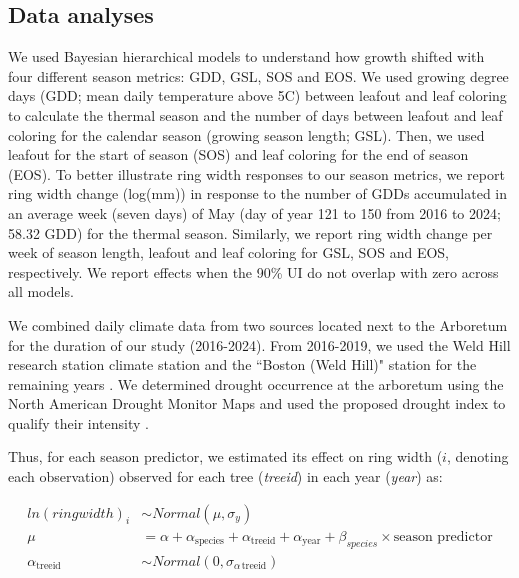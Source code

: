 \subsection{Data analyses}
We used Bayesian hierarchical models to understand how growth shifted with four different season metrics: GDD, GSL, SOS and EOS. We used growing degree days (GDD; mean daily temperature above 5\degree C) between leafout and leaf coloring to calculate the thermal season and the number of days between leafout and leaf coloring for the calendar season (growing season length; GSL). Then, we used leafout for the start of season (SOS) and leaf coloring for the end of season (EOS). To better illustrate ring width responses to our season metrics, we report ring width change (log(mm)) in response to the number of GDDs accumulated in an average week (seven days) of May (day of year 121 to 150 from 2016 to 2024; 58.32 GDD) for the thermal season. Similarly, we report ring width change per week of season length, leafout and leaf coloring for GSL, SOS and EOS, respectively. We report effects when the 90\% UI do not overlap with zero across all models.

We combined daily climate data from two sources located next to the Arboretum for the duration of our study (2016-2024). From 2016-2019, we used the Weld Hill research station climate station \citep{arnoldarboretum_weather_2026} and the ``Boston (Weld Hill)" station for the remaining years \citep[2020-2024;][]{carroll_network_2026}. We determined drought occurrence at the arboretum using the North American Drought Monitor Maps and used the proposed drought index to qualify their intensity \citep{nationalcentersforenvironmentalinformationncei_north_2026}. 

Thus, for each season predictor, we estimated its effect on ring width ($i$, denoting each observation) observed for each tree (\textit{treeid}) in each year (\textit{year}) as:

\begin{equation}
\begin{aligned} 
ln(ringwidth)_i &\sim Normal(\mu, \sigma_y) \\
\mu &= \alpha + \alpha_{\text{species}} + \alpha_{\text{treeid}} + \alpha_{\text{year}} + \beta_{species} \times \text{season predictor} \\
\alpha_{\text{treeid}} &\sim Normal(0, \sigma_{\alpha \, \text{treeid}}) \\
\end{aligned}
\label{eq:mainMdl}
\end{equation}

